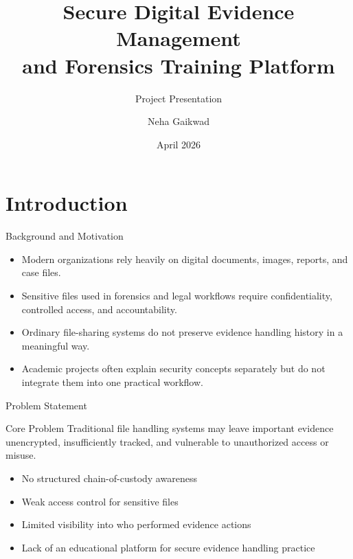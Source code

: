 \documentclass[aspectratio=169]{beamer}
\title[Secure Digital Evidence Platform]{Secure Digital Evidence Management\\and Forensics Training Platform}
\subtitle{Project Presentation}
\author{Neha Gaikwad}
\institute{School of Engineering\\Ajeenkya DY Patil University, Pune}
\date{April 2026}
\begin{document}
\begin{frame}[plain]
    \titlepage
\end{frame}

\section{Introduction}

\begin{frame}{Background and Motivation}
    \begin{itemize}
        \item Modern organizations rely heavily on digital documents, images, reports, and case files.
        \item Sensitive files used in forensics and legal workflows require confidentiality, controlled access, and accountability.
        \item Ordinary file-sharing systems do not preserve evidence handling history in a meaningful way.
        \item Academic projects often explain security concepts separately but do not integrate them into one practical workflow.
    \end{itemize}
\end{frame}

\begin{frame}{Problem Statement}
    \begin{block}{Core Problem}
        Traditional file handling systems may leave important evidence unencrypted, insufficiently tracked, and vulnerable to unauthorized access or misuse.
    \end{block}

    \vspace{0.3cm}

    \begin{itemize}
        \item No structured chain-of-custody awareness
        \item Weak access control for sensitive files
        \item Limited visibility into who performed evidence actions
        \item Lack of an educational platform for secure evidence handling practice
    \end{itemize}
\end{frame}
\end{document}
